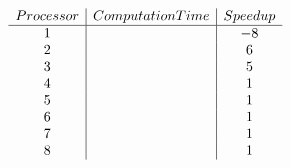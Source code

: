 \documentclass{article}
\begin{document}
\begin{align}
    \begin{array}{c | c | c}
         Processor  & Computation Time & Speedup \\ 
         \hline %
         1   &  & -8 \\
         2   &  &  6  \\
         3   &  & 5 \\
         4   &  & 1 \\
         5   &  & 1 \\
         6   &  & 1 \\
         7   &  & 1 \\
         8   &  & 1 \\
    \end{array}
\end{align}
\end{document}
